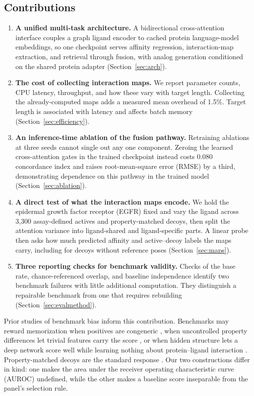 \documentclass{ieeeaccess}
\begin{document}
\subsection{Contributions}
\begin{enumerate}
\item \textbf{A unified multi-task architecture.} A bidirectional
cross-attention interface couples a graph ligand encoder to cached protein
language-model embeddings, so one checkpoint serves affinity regression,
interaction-map extraction, and retrieval through fusion, with analog generation
conditioned on the shared protein adapter (Section~\ref{sec:arch}).

\item \textbf{The cost of collecting interaction maps.} We report
parameter counts, CPU latency, throughput, and how these vary with target length.
Collecting the already-computed maps adds a measured mean overhead of 1.5\%.
Target length is associated with latency and affects batch memory
(Section~\ref{sec:efficiency}).

\item \textbf{An inference-time ablation of the fusion pathway.} Retraining
ablations at three seeds cannot single out any one component. Zeroing the learned
cross-attention gates in the trained checkpoint instead costs 0.080 concordance
index and raises root-mean-square error (RMSE) by a third, demonstrating
dependence on this pathway in the trained model
(Section~\ref{sec:ablation}).

\item \textbf{A direct test of what the interaction maps encode.} We hold the
epidermal growth factor receptor (EGFR) fixed and vary the ligand across
3{,}300 assay-defined actives and
property-matched decoys, then split the attention variance into
ligand-shared and ligand-specific parts. A linear probe then asks how much
predicted affinity and active--decoy labels the maps carry, including for
decoys without reference poses (Section~\ref{sec:maps}).

\item \textbf{Three reporting checks for benchmark validity.} Checks of the base
rate, chance-referenced overlap, and baseline independence identify two
benchmark failures with little additional computation. They distinguish a
repairable benchmark from one that requires rebuilding
(Section~\ref{sec:evalmethod}).
\end{enumerate}

Prior studies of benchmark bias inform this contribution. Benchmarks may
reward memorization when positives are congeneric
\cite{rohrer2009muv,wallach2018memorization}, when uncontrolled
property differences let trivial features carry the score
\cite{sieg2019bias}, or when hidden structure lets a deep network score
well while learning nothing about protein--ligand interaction
\cite{chen2019hiddenbias}. Property-matched decoys are the standard response
\cite{mysinger2012dude,trannguyen2020litpcba}. Our two constructions differ in
kind: one makes the area under the receiver operating characteristic curve
(AUROC) undefined, while the other makes a baseline score
inseparable from the panel's selection rule.
\end{document}
